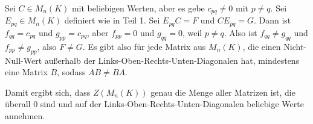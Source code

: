 \documentclass[a4paper,10pt]{article}
\begin{document}
Sei $C \in M_n(K)$ mit beliebigen Werten, aber es gebe $c_{pq} \ne 0$ mit $p \ne q$.
Sei $E_{pq} \in M_n(K)$ definiert wie in Teil 1.
Sei $E_{pq}C = F$ und $CE_{pq} = G$.
Dann ist $f_{qq} = c_{pq}$ und $g_{pp} = c_{pq}$, aber $f_{pp} = 0$ und $g_{qq} = 0$, weil $p \ne q$.
Also ist $f_{qq} \ne g_{qq}$ und $f_{pp} \ne g_{pp}$, also $F \ne G$.
Es gibt also für jede Matrix aus $M_n(K)$, die einen Nicht-Null-Wert außerhalb der Links-Oben-Rechts-Unten-Diagonalen hat, mindestens eine Matrix $B$, sodass $AB \ne BA$.

Damit ergibt sich, dass $Z(M_n(K))$ genau die Menge aller Matrizen ist, die überall $0$ sind und auf der Links-Oben-Rechts-Unten-Diagonalen beliebige Werte annehmen.
\end{document}
